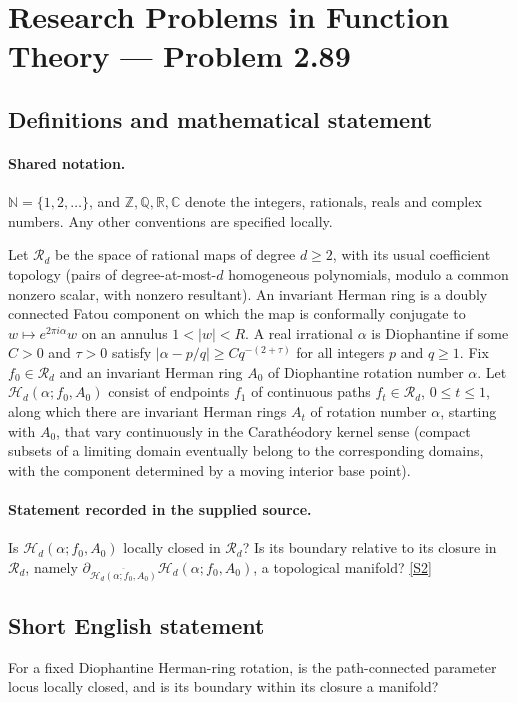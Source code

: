 \documentclass[11pt]{article}
\newcommand{\sref}[2]{\hyperlink{source:#1:#2}{[S#2]}}
\begin{document}
\section{Research Problems in Function Theory — Problem 2.89}\label{statement}

\subsection{Definitions and mathematical statement}

\paragraph{Shared notation.}$\mathbb N=\{1,2,\ldots\}$, and $\mathbb Z,\mathbb Q,\mathbb R,\mathbb C$ denote the integers, rationals, reals and complex numbers. Any other conventions are specified locally.


Let $\mathcal R_d$ be the space of rational maps of degree $d\geq2$, with its usual coefficient topology (pairs of degree-at-most-$d$ homogeneous polynomials, modulo a common nonzero scalar, with nonzero resultant). An invariant Herman ring is a doubly connected Fatou component on which the map is conformally conjugate to $w\mapsto e^{2\pi i\alpha}w$ on an annulus $1<|w|<R$. A real irrational $\alpha$ is Diophantine if some $C>0$ and $\tau>0$ satisfy $|\alpha-p/q|\geq Cq^{-(2+\tau)}$ for all integers $p$ and $q\geq1$.
Fix $f_0\in\mathcal R_d$ and an invariant Herman ring $A_0$ of Diophantine rotation number $\alpha$. Let $\mathcal H_d(\alpha;f_0,A_0)$ consist of endpoints $f_1$ of continuous paths $f_t\in\mathcal R_d$, $0\leq t\leq1$, along which there are invariant Herman rings $A_t$ of rotation number $\alpha$, starting with $A_0$, that vary continuously in the Carath\'eodory kernel sense (compact subsets of a limiting domain eventually belong to the corresponding domains, with the component determined by a moving interior base point).
\paragraph{Statement recorded in the supplied source.}
Is $\mathcal H_d(\alpha;f_0,A_0)$ locally closed in $\mathcal R_d$? Is its boundary relative to its closure in $\mathcal R_d$, namely $\partial_{\overline{\mathcal H_d(\alpha;f_0,A_0)}}\mathcal H_d(\alpha;f_0,A_0)$, a topological manifold? \sref{statement}{2}
\subsection{Short English statement}
For a fixed Diophantine Herman-ring rotation, is the path-connected parameter locus locally closed, and is its boundary within its closure a manifold?
\end{document}
